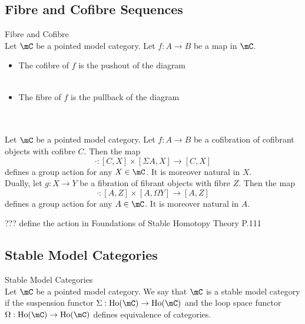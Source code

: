 \documentclass[a4paper]{article}
\begin{document}
\subsection{Fibre and Cofibre Sequences}
\begin{defn}{Fibre and Cofibre}{}\\ Let $\mC$ be a pointed model category. Let $f:A\to B$ be a map in $\mC$. 
\begin{itemize}
\item The cofibre of $f$ is the pushout of the diagram \\
\\
\item The fibre of $f$ is the pullback of the diagram \\
\\
\end{itemize}
\end{defn}

\begin{thm}{}{}\\ Let $\mC$ be a pointed model category. Let $f:A\to B$ be a cofibration of cofibrant objects with cofibre $C$. Then the map $$\cdot:[C,X]\times[\Sigma A,X]\to[C,X]$$ defines a group action for any $X\in\mC$. It is moreover natural in $X$. \\

Dually, let $g:X\to Y$ be a fibration of fibrant objects with fibre $Z$. Then the map $$\cdot:[A,Z]\times[A,\Omega Y]\to[A,Z]$$ defines a group action for any $A\in\mC$. It is moreover natural in $A$. 
\end{thm}

??? define the action in Foundations of Stable Homotopy Theory P.111

\subsection{Stable Model Categories}
\begin{defn}{Stable Model Categories}{}\\ Let $\mC$ be a pointed model category. We say that $\mC$ is a stable model category if the suspension functor $\Sigma:\text{Ho}(\mC)\to\text{Ho}(\mC)$ and the loop space functor $\Omega:\text{Ho}(\mC)\to\text{Ho}(\mC)$ defines equivalence of categories. 
\end{defn}
\end{document}

